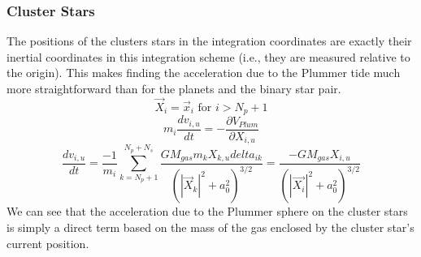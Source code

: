 \documentclass{aastex631}
\begin{document}
\subsubsection{Cluster Stars}
The positions of the clusters stars in the integration coordinates are exactly their inertial coordinates in this integration scheme 
(i.e., they are measured relative to the origin). This makes finding the acceleration due to the Plummer tide much more straightforward 
than for the planets and the binary star pair.
\begin{equation}
    \vec{X}_i = \vec{x}_i \text{  for  } i>N_p+1
\end{equation}
\begin{equation}
    m_i\frac{dv_{i,u}}{dt} = -\frac{\partial V_{Plum}}{\partial X_{i,u}}
\end{equation}
\begin{equation}
    \frac{dv_{i,u}}{dt} = \frac{-1}{m_i}\sum_{k=N_p+1}^{N_p+N_s}\frac{GM_{gas}m_kX_{k,u}delta_{ik}}{(|\vec{X}_k|^2+a_0^2)^{3/2}} = 
    \frac{-GM_{gas}X_{i,u}}{(|\vec{X_i}|^2+a_0^2)^{3/2}}
\end{equation}
We can see that the acceleration due to the Plummer sphere on the cluster stars is simply a direct term based on the mass of the gas 
enclosed by the cluster star's current position.
\end{document}
